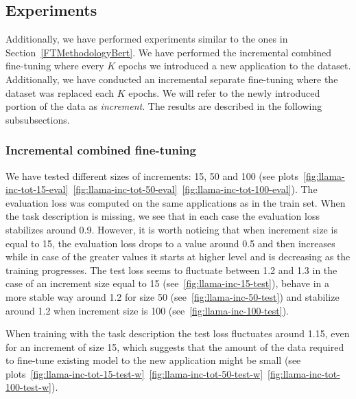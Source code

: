 \documentclass[licencjacka,en]{pracamgr}
\begin{document}
\subsection{Experiments}
Additionally, we have performed experiments similar to the ones in Section~\ref{FTMethodologyBert}. We have performed the incremental combined fine-tuning where every $K$ epochs we introduced a new application to the dataset. Additionally, we have conducted an incremental separate fine-tuning where the dataset was replaced each $K$ epochs. We will refer to the newly introduced portion of the data as \emph{increment}. The results are described in the following subsubsections.
\subsubsection{Incremental combined fine-tuning}
We have tested different sizes of increments: 15, 50 and 100 (see plots~\ref{fig:llama-inc-tot-15-eval}~\ref{fig:llama-inc-tot-50-eval}~\ref{fig:llama-inc-tot-100-eval}). The evaluation loss was computed on the same applications as in the train set. When the task description is missing, we see that in each case the evaluation loss stabilizes around 0.9. However, it is worth noticing that when increment size is equal to 15, the evaluation loss drops to a value around 0.5 and then increases while in case of the greater values it starts at higher level and is decreasing as the training progresses. The test loss seems to fluctuate between 1.2 and 1.3 in the case of an increment size equal to 15 (see~\ref{fig:llama-inc-15-test}), behave in a more stable way around 1.2 for size 50 (see~\ref{fig:llama-inc-50-test}) and stabilize around 1.2 when increment size is 100 (see~\ref{fig:llama-inc-100-test}).

When training with the task description the test loss fluctuates around 1.15, even for an increment of size 15, which suggests that the amount of the data required to fine-tune existing model to the new application might be small (see plots~\ref{fig:llama-inc-tot-15-test-w}~\ref{fig:llama-inc-tot-50-test-w}~\ref{fig:llama-inc-tot-100-test-w}).
\end{document}

